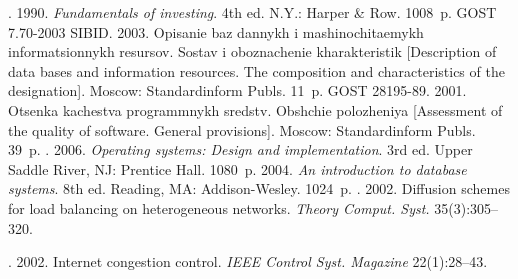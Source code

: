 

  \begin{multicols}{2}

\renewcommand{\bibname}{\protect\rmfamily References}

{\small\frenchspacing
 {%
 \begin{thebibliography}{99}

. 1990. \textit{Fundamentals of investing}.
4th ed. N.Y.: Harper \& Row. 1008~p.
GOST 7.70-2003 SIBID. 2003. Opisanie baz dannykh i mashinochitaemykh
informatsionnykh resursov. Sostav i oboznachenie kharakteristik [Description of data
bases and information resources. The composition and characteristics of the
designation]. Moscow: Standardinform Publs. 11~p.
GOST 28195-89. 2001. Otsenka kachestva programmnykh sredstv. Obshchie
polozheniya [Assessment of the quality of software. General provisions]. Moscow:
Standardinform Publs. 39~p.
. 2006. \textit{Operating systems:
Design and implementation}. 3rd ed. Upper Saddle River, NJ: Prentice Hall. 1080~p.
 2004. \textit{An introduction to database systems}. 8th ed.
Reading, MA: Addison-Wesley. 1024~p.
. 2002. Diffusion
schemes for load balancing on heterogeneous networks. \textit{Theory Comput.
Syst.} 35(3):305--320.

. 2002. Internet congestion
control. \textit{IEEE Control Syst. Magazine} 22(1):28--43.


\end{thebibliography}}}
\end{multicols}
